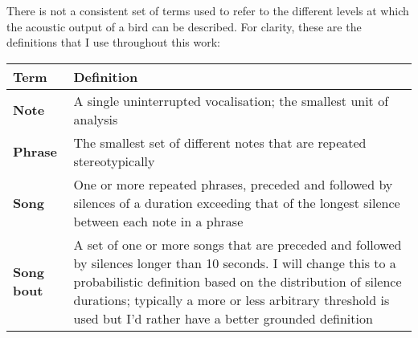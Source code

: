 \documentclass[]{report}
\begin{document}
There is not a consistent set of terms used to refer to the different
levels at which the acoustic output of a bird can be described. For
clarity, these are the definitions that I use throughout this work:

\begin{longtable}[]{@{}ll@{}}
\toprule
\begin{minipage}[b]{0.17\columnwidth}\raggedright
Term\strut
\end{minipage} & \begin{minipage}[b]{0.77\columnwidth}\raggedright
Definition\strut
\end{minipage}\tabularnewline
\midrule
\endhead
\begin{minipage}[t]{0.17\columnwidth}\raggedright
\textbf{Note}\strut
\end{minipage} & \begin{minipage}[t]{0.77\columnwidth}\raggedright
A single uninterrupted vocalisation; the smallest unit of analysis\strut
\end{minipage}\tabularnewline
\begin{minipage}[t]{0.17\columnwidth}\raggedright
\textbf{Phrase}\strut
\end{minipage} & \begin{minipage}[t]{0.77\columnwidth}\raggedright
The smallest set of different notes that are repeated
stereotypically\strut
\end{minipage}\tabularnewline
\begin{minipage}[t]{0.17\columnwidth}\raggedright
\textbf{Song}\strut
\end{minipage} & \begin{minipage}[t]{0.77\columnwidth}\raggedright
One or more repeated phrases, preceded and followed by silences of a
duration exceeding that of the longest silence between each note in a
phrase\strut
\end{minipage}\tabularnewline
\begin{minipage}[t]{0.17\columnwidth}\raggedright
\textbf{Song bout}\strut
\end{minipage} & \begin{minipage}[t]{0.77\columnwidth}\raggedright
A set of one or more songs that are preceded and followed by silences
longer than 10 seconds. I will change this to a probabilistic definition
based on the distribution of silence durations; typically a more or less
arbitrary threshold is used but I'd rather have a better grounded
definition\strut
\end{minipage}\tabularnewline
\bottomrule
\end{longtable}
\end{document}
